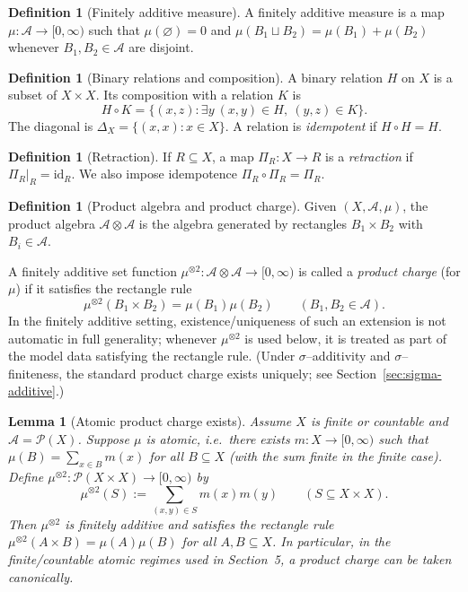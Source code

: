 \documentclass[11pt]{article}
\numberwithin{equation}{section}
\newtheorem{lemma}[theorem]{Lemma}
\theoremstyle{definition}
\newtheorem{definition}[theorem]{Definition}
\begin{document}
\begin{definition}[Finitely additive measure]
A finitely additive measure is a map $\mu:\mathcal A\to[0,\infty)$ such that $\mu(\varnothing)=0$ and
$\mu(B_1\sqcup B_2)=\mu(B_1)+\mu(B_2)$ whenever $B_1,B_2\in\mathcal A$ are disjoint.
\end{definition}

\begin{definition}[Binary relations and composition]
A binary relation $H$ on $X$ is a subset of $X\times X$. Its composition with a relation $K$ is
\[
H\circ K = \{(x,z):\exists y\ (x,y)\in H,\ (y,z)\in K\}.
\]
The diagonal is $\Delta_X=\{(x,x):x\in X\}$. A relation is \emph{idempotent} if $H\circ H=H$.
\end{definition}

\begin{definition}[Retraction]
If $R\subseteq X$, a map $\Pi_R:X\to R$ is a \emph{retraction} if $\Pi_R|_R=\mathrm{id}_R$.
We also impose idempotence $\Pi_R\circ\Pi_R=\Pi_R$.
\end{definition}

\begin{definition}[Product algebra and product charge]\label{def:product-measure}
Given $(X,\mathcal A,\mu)$, the product algebra $\mathcal A\otimes\mathcal A$ is the algebra generated by rectangles
$B_1\times B_2$ with $B_i\in\mathcal A$.

A finitely additive set function $\mu^{\otimes2}:\mathcal A\otimes\mathcal A\to[0,\infty)$ is called a \emph{product charge}
(for $\mu$) if it satisfies the rectangle rule
\[
\mu^{\otimes2}(B_1\times B_2)=\mu(B_1)\mu(B_2)\qquad(B_1,B_2\in\mathcal A).
\]
In the finitely additive setting, existence/uniqueness of such an extension is not automatic in full generality; whenever
$\mu^{\otimes2}$ is used below, it is treated as part of the model data satisfying the rectangle rule.
(Under $\sigma$--additivity and $\sigma$--finiteness, the standard product charge exists uniquely; see Section~\ref{sec:sigma-additive}.)
\end{definition}

\begin{lemma}[Atomic product charge exists]\label{lem:atomic-product-charge}
Assume $X$ is finite or countable and $\mathcal A=\mathcal P(X)$. Suppose $\mu$ is atomic, i.e.\ there exists
$m:X\to[0,\infty)$ such that $\mu(B)=\sum_{x\in B}m(x)$ for all $B\subseteq X$ (with the sum finite in the finite case).
Define $\mu^{\otimes2}:\mathcal P(X\times X)\to[0,\infty)$ by
\[
\mu^{\otimes2}(S):=\sum_{(x,y)\in S} m(x)m(y)\qquad(S\subseteq X\times X).
\]
Then $\mu^{\otimes2}$ is finitely additive and satisfies the rectangle rule
$\mu^{\otimes2}(A\times B)=\mu(A)\mu(B)$ for all $A,B\subseteq X$.
In particular, in the finite/countable atomic regimes used in Section~5, a product charge can be taken canonically.
\end{lemma}
\end{document}
